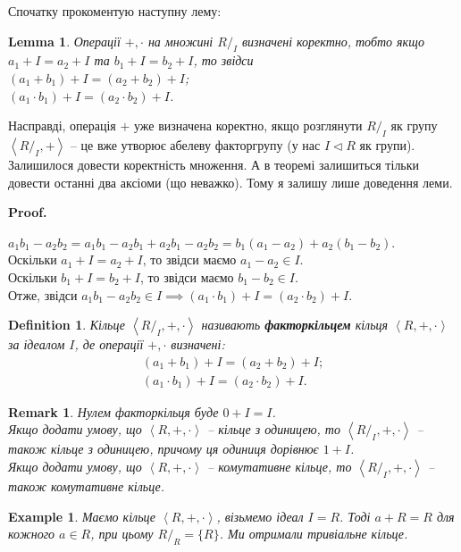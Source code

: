 \documentclass[a4paper, 10pt]{article}
\makeatletter
\theoremstyle{theoremdd}
\theoremstyle{theoremdd}
\newtheorem{definition}[theorem]{Definition}
\theoremstyle{theoremdd}
\theoremstyle{theoremdd}
\theoremstyle{theoremdd}
\newtheorem{example}[theorem]{Example}
\theoremstyle{theoremdd}
\theoremstyle{theoremdd}
\theoremstyle{theoremdd}
\theoremstyle{theoremdd}
\theoremstyle{theoremdd}
\theoremstyle{theoremdd}
\newtheorem{remark}[theorem]{Remark}
\theoremstyle{theoremdd}
\theoremstyle{theoremdd}
\newtheorem{lemma}[theorem]{Lemma}
\theoremstyle{theoremdd}
\theoremstyle{theoremdd}
\renewenvironment{proof}[1][Proof.\\]{\par
\pushQED{\hfill \qed}%
\normalfont \topsep6\p@\@plus6\p@\relax
\trivlist
\item\relax
{\bfseries
#1\@addpunct{.}}\hspace\labelsep\ignorespaces
}{%
\popQED\endtrivlist\@endpefalse
}
\makeatother
\begin{document}
Спочатку прокоментую наступну лему:
\begin{lemma}
Операції $+,\cdot$ на множині $R/_I$ визначені коректно, тобто якщо $a_1+I = a_2+I$ та $b_1+I = b_2+I$, то звідси \\
$(a_1+b_1) + I = (a_2+b_2) + I$;\\
$(a_1 \cdot b_1) + I = (a_2 \cdot b_2) + I$.
\end{lemma}

Насправді, операція $+$ уже визначена коректно, якщо розглянути $R/_I$ як групу $\left<R/_I, + \right>$ -- це вже утворює абелеву факторгрупу (у нас $I \triangleleft R$ як групи). Залишилося довести коректність множення. А в теоремі залишиться тільки довести останні два аксіоми (що неважко). Тому я залишу лише доведення леми.

\begin{proof}
$a_1b_1 - a_2b_2 = a_1b_1 - a_2b_1 + a_2b_1 - a_2b_2 = b_1(a_1 - a_2) + a_2(b_1 - b_2)$.\\
Оскільки $a_1 + I = a_2 + I$, то звідси маємо $a_1 - a_2 \in I$.\\
Оскільки $b_1 + I = b_2 + I$, то звідси маємо $b_1 - b_2 \in I$.\\
Отже, звідси $a_1b_1 - a_2b_2 \in I \implies (a_1 \cdot b_1) + I = (a_2 \cdot b_2) + I$.
\end{proof}

\begin{definition}
Кільце $\left<R/_I,+,\cdot \right>$ називають \textbf{факторкільцем} кільця $\left<R,+,\cdot \right>$ за ідеалом $I$, де операції $+, \cdot$ визначені:
\begin{align*}
(a_1+b_1) + I = (a_2+b_2) + I;\\
(a_1 \cdot b_1) + I = (a_2 \cdot b_2) + I.
\end{align*}
\end{definition}

\begin{remark}
Нулем факторкільця буде $0+I = I$.\\
Якщо додати умову, що $\left< R, + ,\cdot \right>$ -- кільце з одиницею, то $\left< R/_I, + ,\cdot \right>$ -- також кільце з одиницею, причому ця одиниця дорівнює $1 + I$.\\
Якщо додати умову, що $\left< R, + ,\cdot \right>$ -- комутативне кільце, то $\left< R/_I, + ,\cdot \right>$ -- також комутативне кільце.
\end{remark}

\begin{example}
Маємо кільце $\left<R,+,\cdot \right>$, візьмемо ідеал $I = R$. Тоді $a+R = R$ для кожного $a \in R$, при цьому $R/_R = \{R\}$. Ми отримали тривіальне кільце.
\end{example}
\end{document}
